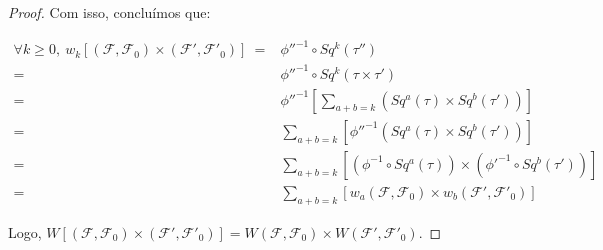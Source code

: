 \documentclass[12pt,oneside]{book} %
\newcommand{\ds}{\displaystyle}
\begin{document}
\begin{proof}
	\par Com isso, concluímos que: \newline
	
	$\begin{array}{rl}
		\forall k\geq 0, \ w_{k}[(\mathcal{F},\mathcal{F}_{0})\times (\mathcal{F'},\mathcal{F'}_{0})] \ = & \phi''^{-1}\circ Sq^{k}(\tau'') \\
		= & \phi''^{-1}\circ Sq^{k}(\tau\times \tau') \\
		= & \phi''^{-1}\left[ \ds\sum_{a+b=k}\left( Sq^{a}(\tau)\times Sq^{b}(\tau')\right) \right] \\
		= & \ds\sum_{a+b=k}\left[\phi''^{-1} \left( Sq^{a}(\tau)\times Sq^{b}(\tau')\right) \right] \\
		= & \ds\sum_{a+b=k}\left[ \left( \phi^{-1}\circ Sq^{a}(\tau) \right)\times \left( \phi'^{-1}\circ Sq^{b}(\tau') \right)\right] \\
		= & \ds\sum_{a+b=k}\left[ w_{a}(\mathcal{F},\mathcal{F}_{0})\times w_{b}(\mathcal{F'},\mathcal{F'}_{0}) \right]
	\end{array}$ \newline
	
	\par Logo, $W[(\mathcal{F},\mathcal{F}_{0})\times (\mathcal{F'},\mathcal{F'}_{0})]=W(\mathcal{F},\mathcal{F}_{0})\times W(\mathcal{F'},\mathcal{F'}_{0})$.
	
\end{proof}
\end{document}
